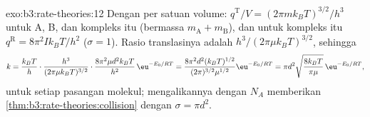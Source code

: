\begin{solution}{exo:b3:rate-theories:12}
Dengan  per satuan volume: $q^{\mathrm T}/V = (2\pi mk_BT)^{3/2}/h^3$
untuk A, B, dan kompleks itu (bermassa $m_{\mathrm A} + m_{\mathrm B}$), dan untuk
kompleks itu $q^{\mathrm R} = 8\pi^2Ik_BT/h^2$
($\sigma = 1$). Rasio translasinya adalah $h^3/(2\pi\mu k_BT)^{3/2}$, sehingga
\[
  k = \frac{k_BT}{h}\cdot\frac{h^3}{(2\pi\mu k_BT)^{3/2}}\cdot\frac{8\pi^2\mu d^2k_BT}{h^2}\,\eu^{-E_0/RT}
    = \frac{8\pi^2d^2(k_BT)^{1/2}}{(2\pi)^{3/2}\mu^{1/2}}\eu^{-E_0/RT}
    = \pi d^2\sqrt{\frac{8k_BT}{\pi\mu}}\,\eu^{-E_0/RT},
\]
untuk setiap pasangan molekul; mengalikannya dengan $N_A$ memberikan
\cref{thm:b3:rate-theories:collision} dengan $\sigma = \pi d^2$.
\end{solution}

